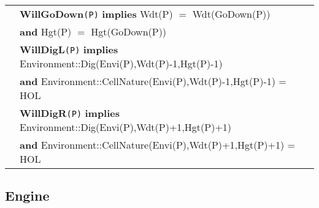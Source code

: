 \documentclass{article}
\begin{document}
\begin{tabular}{rl}
& \textbf{WillGoDown}\texttt{(P)}  \textbf{implies}  \textrm{Wdt(P)} $=$ \textrm{Wdt(GoDown(P))}\\ 
& \quad \textbf{and} \textrm{Hgt(P)} $=$ \textrm{Hgt(GoDown(P))}\\

& \textbf{WillDigL}\texttt{(P)} \textbf{implies}
\textrm{Environment::Dig(Envi(P),Wdt(P)-1,Hgt(P)-1)}\\
& \quad \textbf{and} \textrm{Environment::CellNature(Envi(P),Wdt(P)-1,Hgt(P)-1)} = \textrm{HOL} \\

& \textbf{WillDigR}\texttt{(P)} \textbf{implies} \textrm{Environment::Dig(Envi(P),Wdt(P)+1,Hgt(P)+1)}\\

& \quad \textbf{and} \textrm{Environment::CellNature(Envi(P),Wdt(P)+1,Hgt(P)+1)} = \textrm{HOL} \\

\end{tabular}


\subsection*{Engine}
\end{document}
